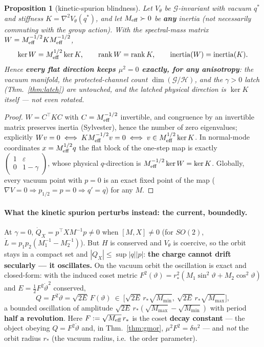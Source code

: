 \documentclass[11pt]{article}
\theoremstyle{plain}
\newtheorem{proposition}{Proposition}
\theoremstyle{definition}
\begin{document}
\begin{proposition}[kinetic-spurion blindness]\label{prop:kinblind}
Let $V_\theta$ be $\mathcal G$-invariant with vacuum $q^\ast$ and stiffness $K=\nabla^2V_\theta(q^\ast)$, and let $M_{\rm eff}\succ0$ be \textbf{any} inertia (not necessarily commuting with the group action). With the spectral-mass matrix $W=M_{\rm eff}^{-1/2}KM_{\rm eff}^{-1/2}$,
\[ \ker W=M_{\rm eff}^{1/2}\ker K,\qquad \operatorname{rank}W=\operatorname{rank}K,\qquad \operatorname{inertia}(W)=\operatorname{inertia}(K). \]
Hence \textbf{every flat direction keeps $\mu^2=0$ exactly, for any anisotropy}: the vacuum manifold, the protected-channel count $\dim(\mathcal G/\mathcal H)$, and the $\gamma>0$ latch (Thm.~\ref{thm:latch}) are untouched, and the latched \emph{physical} direction is $\ker K$ itself --- not even rotated.
\end{proposition}
\begin{proof}
$W=C^\top KC$ with $C=M_{\rm eff}^{-1/2}$ invertible, and congruence by an invertible matrix preserves inertia (Sylvester), hence the number of zero eigenvalues; explicitly $Wv=0\iff KM_{\rm eff}^{-1/2}v=0\iff v\in M_{\rm eff}^{1/2}\ker K$. In normal-mode coordinates $x=M_{\rm eff}^{1/2}q$ the flat block of the one-step map is exactly $\left(\begin{smallmatrix}1&\varepsilon\\0&1-\gamma\end{smallmatrix}\right)$, whose physical $q$-direction is $M_{\rm eff}^{-1/2}\ker W=\ker K$. Globally, every vacuum point with $p=0$ is an exact fixed point of the map ($\nabla V=0\Rightarrow p_{1/2}=p=0\Rightarrow q'=q$) for any $M$.
\end{proof}

\paragraph{What the kinetic spurion perturbs instead: the current, boundedly.} At $\gamma=0$, $\dot Q_X=p^\top XM^{-1}p\neq0$ when $[M,X]\neq0$ (for $SO(2)$, $\dot L=p_1p_2(M_1^{-1}-M_2^{-1})$). But $H$ is conserved and $V_\theta$ is coercive, so the orbit stays in a compact set and $|Q_X|\le\sup|q||p|$: \textbf{the charge cannot drift secularly --- it oscillates.} On the vacuum orbit the oscillation is exact and closed-form: with the induced coset metric $F^2(\vartheta)=r_\ast^2(M_1\sin^2\vartheta+M_2\cos^2\vartheta)$ and $E=\tfrac12F^2\dot\vartheta^2$ conserved,
\[ Q=F^2\dot\vartheta=\sqrt{2E}\,F(\vartheta)\ \in\ \Big[\sqrt{2E}\,r_\ast\sqrt{M_{\min}},\ \sqrt{2E}\,r_\ast\sqrt{M_{\max}}\Big], \]
a bounded oscillation of amplitude $\sqrt{2E}\,r_\ast(\sqrt{M_{\max}}-\sqrt{M_{\min}})$ with period \textbf{half a revolution}. Here $F:=\sqrt{M_{\rm eff}}\,r_\ast$ is the coset \textbf{decay constant} --- the object obeying $Q=F^2\dot\vartheta$ and, in Thm.~\ref{thm:gmor}, $\mu^2F^2=\delta n^2$ --- and \emph{not} the orbit radius $r_\ast$ (the vacuum radius, i.e.\ the order parameter).
\end{document}
